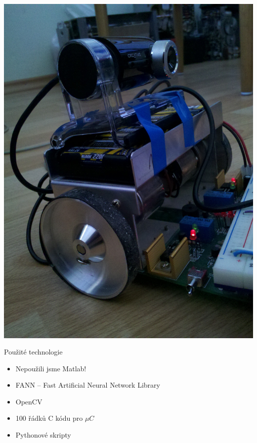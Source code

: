 \documentclass{beamer}
\begin{document}
{

\begin{frame}[plain]
\begin{centering}
\hspace{1.5cm}
\includegraphics[height=1.05\paperheight]{img2.jpg}
\end{centering}
\end{frame}

}

\begin{frame}{Použité technologie}
\begin{itemize}
\item Nepoužili jsme Matlab!
\item FANN -- Fast Artificial Neural Network Library
\item OpenCV
\item 100 řádků C kódu pro $\mu{}C$
\item Pythonové skripty
\end{itemize}
\end{frame}
\end{document}
